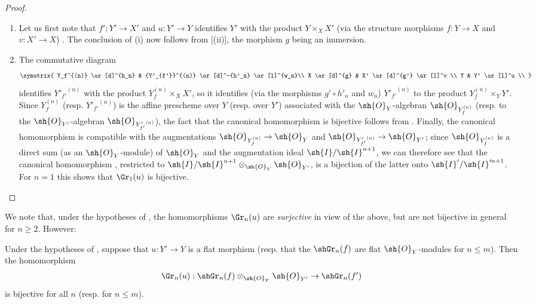 \begin{proof}
\medskip\noindent
\begin{enumerate}
  \item[(i)] Let us first note that $f': Y' \to X'$ and $u: Y' \to Y$  identifies $Y'$ with the product $Y \times_X X'$ (via the structure morphisms $f:Y \to X$ and $v: X' \to X$) .
  The conclusion of (i) now follows from [(ii)], the morphism $g$ being an immersion.
  \item[(ii)] The commutative diagram
  \[
  \xymatrix{
    Y_f^{(n)} \ar[d]^{h_n}  & {Y'_{f'}}^{(n)} \ar[d]^-{h'_n} \ar[l]^{w_n}\\  
    X         \ar[d]^{g}    & X'              \ar[d]^{g'} \ar[l]^v \\  
    Y                       & Y' \ar[l]^u \\  
  }
  \]
  identifies ${Y'_{f'}}^{(n)}$ with the product $Y_f^{(n)} \times_X X'$, so  it identifies (via the morphisms $g'\circ h'_n$ and $w_n$) ${Y'_{f'}}^{(n)}$ to the product $Y_f^{(n)} \times_Y Y'$.
  Since $Y_f^{(n)}$ (resp. ${Y'_{f'}}^{(n)}$) is the affine prescheme over $Y$ (resp. over $Y'$) associated with the $\sh{O}_Y$-algebran $\sh{O}_{Y_f^{(n)}}$ (resp. to the $\sh{O}_{Y'}$-algebran $\sh{O}_{{Y'_{f'}}^{(n)}}$), the fact that the canonical homomorphism  is bijective follows from .
  Finally, the canonical homomorphism  is compatible with the augmentations $\sh{O}_{Y_f^{(n)}} \to \sh{O}_Y$ and $\sh{O}_{{Y'_{f'}}^{(n)}} \to \sh{O}_{Y'}$;
  since $\sh{O}_{Y_f^{(n)}}$ is a direct sum (as an $\sh{O}_Y$-module) of $\sh{O}_Y$ and the augmentation ideal $\sh{I}/\sh{I}^{n+1}$, we can therefore see that the canonical homomorphism , restricted to $\sh{I}/\sh{I}^{n+1} \otimes_{\sh{O}_Y} \sh{O}_{Y'}$, is a bijection of the latter onto $\sh{I}'/\sh{I}'^{n+1}$. For $n=1$ this shows that $\Gr_1(u)$ is bijective.
\end{enumerate}
\end{proof}

We note that, under the hypotheses of , the homomorphisms $\Gr_n(u)$ are \emph{surjective} in view of the above, but are not bijective in general for $n \geq 2$.
However:

\begin{corollary}[16.2.4]
\label{IV.16.2.4}
Under the hypotheses of , suppose that $u: Y' \to Y$ is a flat morphism (resp. that the $\shGr_n(f)$ are flat $\sh{O}_Y$-modules for $n \leq m$).
Then the homomorphism 
\[
  \Gr_n(u):\shGr_n(f) \otimes_{\sh{O}_Y}\sh{O}_{Y'} \to \shGr_n(f')
\]
is bijective for all $n$ (resp. for $n \leq m$).
\end{corollary}


